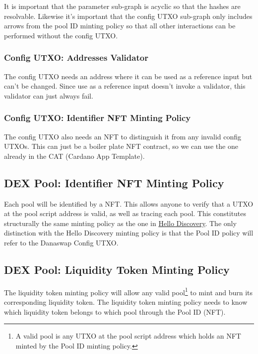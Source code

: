 \documentclass{article}
\begin{document}
It is important that the parameter sub-graph is acyclic so that
the hashes are resolvable. Likewise it's important that
the config UTXO sub-graph only includes arrows from the pool ID minting policy
so that all other interactions can be performed without the config UTXO.


\subsubsection{Config UTXO: Addresses Validator}

The config UTXO needs an address where it can be used as a reference
input but can't be changed. Since use as a reference input doesn't
invoke a validator, this validator can just always fail.

\subsubsection{Config UTXO: Identifier NFT Minting Policy}

The config UTXO also needs an NFT to distinguish it from any
invalid config UTXOs. This can just be a boiler plate NFT contract,
so we can use the one already in the CAT (Cardano App Template).

\subsection{DEX Pool: Identifier NFT Minting Policy}

Each pool will be identified by a NFT. This allows anyone to verify that a UTXO
at the pool script address is valid, as well as tracing each pool. This
constitutes structurally the same minting policy as the one in
\href{https://github.com/ArdanaLabs/cardano-app-template/blob/master/onchain/src/HelloDiscovery.hs}{
  Hello Discovery}.
The only distinction with the Hello Discovery minting policy is that the Pool ID
policy will refer to the Danaswap Config UTXO.

\subsection{DEX Pool: Liquidity Token Minting Policy}

The liquidity token minting policy will allow any valid pool\footnote{
  A valid pool is any UTXO at the pool script address which holds an NFT minted
  by the Pool ID minting policy.
} to mint and burn its corresponding liquidity token. The liquidity token
minting policy needs to know which liquidity token belongs to which pool through the
Pool ID (NFT).
\end{document}
